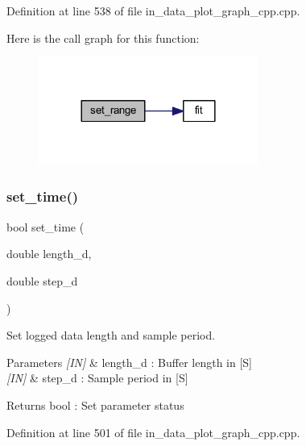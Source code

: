 Definition at line 538 of file in\+\_\+data\+\_\+plot\+\_\+graph\+\_\+cpp.\+cpp.

Here is the call graph for this function\+:
\nopagebreak
\begin{figure}[H]
\begin{center}
\leavevmode
\includegraphics[width=204pt]{group__data__plot_ga5cd933820f813c0a8ca2785c221f2c6a_cgraph}
\end{center}
\end{figure}
\mbox{\label{group__data__plot_gab0d8878374cdaa8e8430df9a6aa313e8}} 
\subsubsection{set\_time()}
{\footnotesize\ttfamily bool set\+\_\+time (\begin{DoxyParamCaption}\item[{double}]{length\+\_\+d,  }\item[{double}]{step\+\_\+d }\end{DoxyParamCaption})}



Set logged data length and sample period. 


\begin{DoxyParams}{Parameters}
{\em \mbox{[}\+I\+N\mbox{]}} & length\+\_\+d \+: Buffer length in [S] \\
\hline
{\em \mbox{[}\+I\+N\mbox{]}} & step\+\_\+d \+: Sample period in [S] \\
\hline
\end{DoxyParams}
\begin{DoxyReturn}{Returns}
bool \+: Set parameter status 
\end{DoxyReturn}


Definition at line 501 of file in\+\_\+data\+\_\+plot\+\_\+graph\+\_\+cpp.\+cpp.

